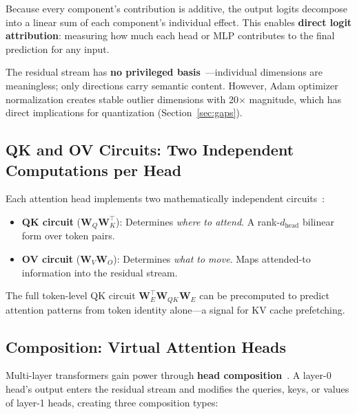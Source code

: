 \documentclass[11pt,letterpaper]{article}
\begin{document}
Because every component's contribution is additive, the output logits decompose into a linear sum of each component's individual effect. This enables \textbf{direct logit attribution}: measuring how much each head or MLP contributes to the final prediction for any input.

The residual stream has \textbf{no privileged basis}~\cite{anthropic2023privileged}---individual dimensions are meaningless; only directions carry semantic content. However, Adam optimizer normalization creates stable outlier dimensions with 20$\times$ magnitude, which has direct implications for quantization (Section~\ref{sec:gaps}).

\subsection{QK and OV Circuits: Two Independent Computations per Head}

Each attention head implements two mathematically independent circuits~\cite{elhage2021framework}:

\begin{itemize}
    \item \textbf{QK circuit} ($\mathbf{W}_Q \mathbf{W}_K^\top$): Determines \emph{where to attend}. A rank-$d_{\text{head}}$ bilinear form over token pairs.
    \item \textbf{OV circuit} ($\mathbf{W}_V \mathbf{W}_O$): Determines \emph{what to move}. Maps attended-to information into the residual stream.
\end{itemize}

The full token-level QK circuit $\mathbf{W}_E^\top \mathbf{W}_{QK} \mathbf{W}_E$ can be precomputed to predict attention patterns from token identity alone---a signal for KV cache prefetching.

\subsection{Composition: Virtual Attention Heads}

Multi-layer transformers gain power through \textbf{head composition}~\cite{elhage2021framework}. A layer-0 head's output enters the residual stream and modifies the queries, keys, or values of layer-1 heads, creating three composition types:
\end{document}
